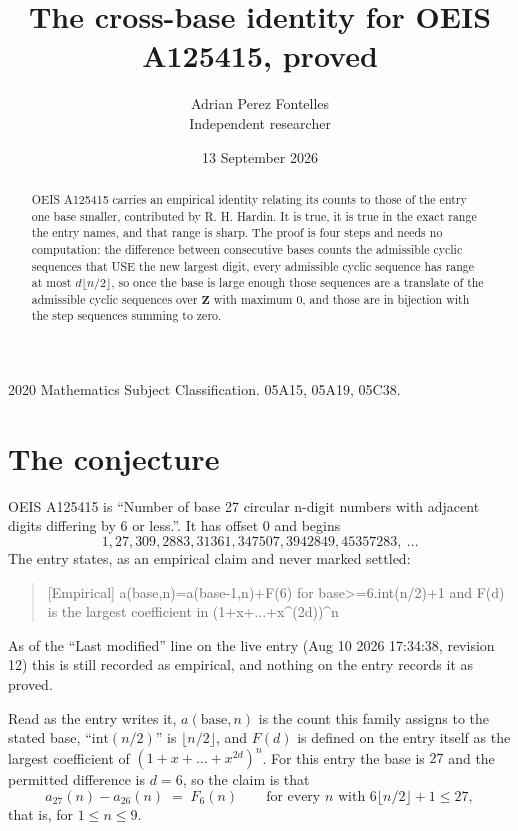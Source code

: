 \documentclass[11pt,a4paper]{article}
\title{The cross-base identity for OEIS A125415, proved}
\author{Adrian Perez Fontelles\\ \small Independent researcher}
\date{13 September 2026}
\theoremstyle{plain}
\theoremstyle{definition}
\begin{document}
\maketitle

\begin{abstract}
OEIS A125415 carries an empirical identity relating its counts to those of the entry one base
smaller, contributed by R. H. Hardin. It is true, it is true in the exact range the entry
names, and that range is sharp. The proof is four steps and needs no computation: the
difference between consecutive bases counts the admissible cyclic sequences that USE the new
largest digit, every admissible cyclic sequence has range at most $d\lfloor n/2\rfloor$, so
once the base is large enough those sequences are a translate of the admissible cyclic
sequences over $\mathbf{Z}$ with maximum $0$, and those are in bijection with the step
sequences summing to zero.
\end{abstract}

\noindent\small 2020 Mathematics Subject Classification. 05A15, 05A19, 05C38.\normalsize

\section{The conjecture}

OEIS A125415 is ``Number of base 27 circular n-digit numbers with adjacent digits differing by 6 or less.''. It has offset $0$ and begins
\[
1, 27, 309, 2883, 31361, 347507, 3942849, 45357283,\ \dots
\]
The entry states, as an empirical claim and never marked settled:
\begin{quote}
[Empirical] a(base,n)=a(base-1,n)+F(6) for base>=6.int(n/2)+1 and F(d) is the largest coefficient in (1+x+...+x\^{}(2d))\^{}n
\end{quote}
As of the ``Last modified'' line on the live entry (Aug 10 2026 17:34:38, revision 12)
this is still recorded as empirical, and nothing on the entry records it as proved.

Read as the entry writes it, $a(\mathrm{base},n)$ is the count this family assigns to the
stated base, ``$\mathrm{int}(n/2)$'' is $\lfloor n/2\rfloor$, and $F(d)$ is defined on the
entry itself as the largest coefficient of $(1+x+\dots+x^{2d})^{n}$. For this entry
the base is $27$ and the permitted difference is $d=6$, so the claim is that
\[
a_{27}(n)-a_{26}(n)\;=\;F_{6}(n)
\qquad\text{for every } n \text{ with } 6\lfloor n/2\rfloor+1\le27,
\]
that is, for $1\le n\le9$.
\end{document}
